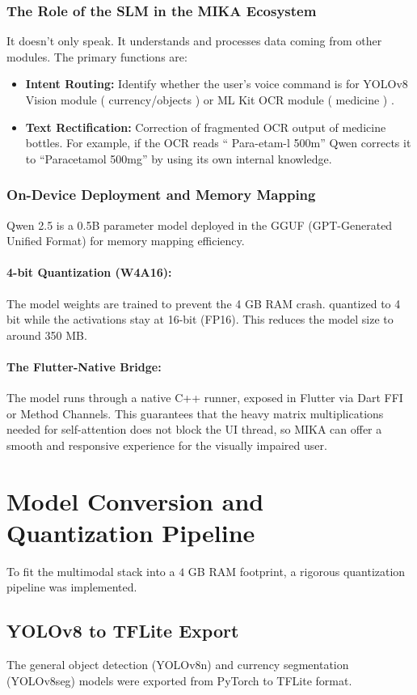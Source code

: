 \documentclass[12pt,a4paper]{report}
\begin{document}
\subsubsection{The Role of the SLM in the MIKA Ecosystem}
It doesn’t only speak. It understands and processes data coming from other modules. The primary functions are:
\begin{itemize}
    \item \textbf{Intent Routing:} Identify whether the user’s voice command is for YOLOv8 Vision module ( currency/objects ) or ML Kit OCR module ( medicine ) .
    \item \textbf{Text Rectification:} Correction of fragmented OCR output of medicine bottles. For example, if the OCR reads “ Para-etam-l 500m” Qwen corrects it to “Paracetamol 500mg” by using its own internal knowledge.
\end{itemize}
 
\subsubsection{On-Device Deployment and Memory Mapping}
Qwen 2.5 is a 0.5B parameter model deployed in the GGUF (GPT-Generated Unified Format) for memory mapping efficiency.

\paragraph{4-bit Quantization (W4A16):} The model weights are trained to prevent the 4 GB RAM crash. quantized to 4 bit while the activations stay at 16-bit (FP16). This reduces the model size to around 350 MB. 
\paragraph{The Flutter-Native Bridge:} The model runs through a native C++ runner, exposed in Flutter via Dart FFI or Method Channels. This guarantees that the heavy matrix multiplications needed for self-attention does not block the UI thread, so MIKA can offer a smooth and responsive experience for the visually impaired user.
 
\section{Model Conversion and Quantization Pipeline}
To fit the multimodal stack into a $4$ GB RAM footprint, a rigorous quantization pipeline was implemented.
 
\subsection{YOLOv8 to TFLite Export}
The general object detection (YOLOv8n) and currency segmentation (YOLOv8\text{-}seg) models were exported from PyTorch to TFLite format.
 
\end{document}
